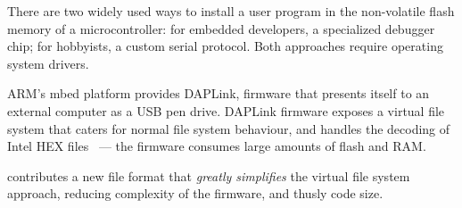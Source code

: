 There are two widely used ways to install a user program in the non-volatile flash memory of a microcontroller: for embedded developers, a specialized debugger chip; for hobbyists, a custom serial protocol. Both approaches require operating system drivers.

ARM's mbed platform provides DAPLink, firmware that presents itself to an external computer as a USB pen drive. DAPLink firmware exposes a virtual file system that caters for normal file system behaviour, and handles the decoding of Intel HEX files~\cite{IntelHEX} --- the firmware consumes large amounts of flash and RAM.

\UF contributes a new file format that \emph{greatly simplifies} the virtual file system approach, reducing complexity of the firmware, and thusly code size.











